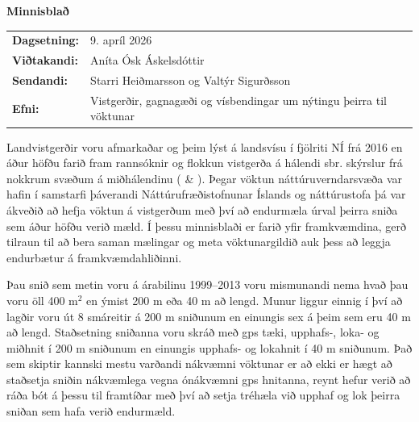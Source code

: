 \documentclass[12pt,a4paper]{article}
\begin{document}
\vspace*{1cm}

\begin{center}
    {\Large \textbf{Minnisblað}}
\end{center}

\vspace{1cm}

\noindent
\begin{tabular}{@{}l l@{}}
\textbf{Dagsetning:} & 9. apríl 2026 \\
\textbf{Viðtakandi:} & Aníta Ósk Áskelsdóttir \\
\textbf{Sendandi:}   & Starri Heiðmarsson og Valtýr Sigurðsson \\
\textbf{Efni:}       & Vistgerðir, gagnagæði og vísbendingar um nýtingu þeirra til vöktunar \\
\end{tabular}

\vspace{1cm}

\noindent
Landvistgerðir voru afmarkaðar og þeim lýst á landsvísu í fjölriti NÍ frá
2016 \cite{ottosson2016} en áður höfðu farið fram rannsóknir og flokkun
vistgerða á hálendi sbr. skýrslur frá nokkrum svæðum á miðhálendinu
(\cite{einarsson2000} \& \cite{magnusson2002}). Þegar vöktun
náttúruverndarsvæða var hafin í samstarfi þáverandi Náttúrufræðistofnunar
Íslands og náttúrustofa þá var ákveðið að hefja vöktun á vistgerðum með
því að endurmæla úrval þeirra sniða sem áður höfðu verið mæld. Í þessu
minnisblaði er farið yfir framkvæmdina, gerð tilraun til að bera saman
mælingar og meta vöktunargildið auk þess að leggja endurbætur á
framkvæmdahliðinni.

\vspace{1cm}

\noindent
Þau snið sem metin voru á árabilinu 1999--2013 voru mismunandi nema hvað
þau voru öll 400 m$^2$ en ýmist 200 m eða 40 m að lengd. Munur liggur
einnig í því að lagðir voru út 8 smáreitir á 200 m sniðunum en einungis
sex á þeim sem eru 40 m að lengd. Staðsetning sniðanna voru skráð með gps
tæki, upphafs-, loka- og miðhnit í 200 m sniðunum en einungis upphafs- og
lokahnit í 40 m sniðunum. Það sem skiptir kannski mestu varðandi nákvæmni
vöktunar er að ekki er hægt að staðsetja sniðin nákvæmlega vegna
ónákvæmni gps hnitanna, reynt hefur verið að ráða bót á þessu til
framtíðar með því að setja tréhæla við upphaf og lok þeirra sniðan sem
hafa verið endurmæld.
\end{document}
